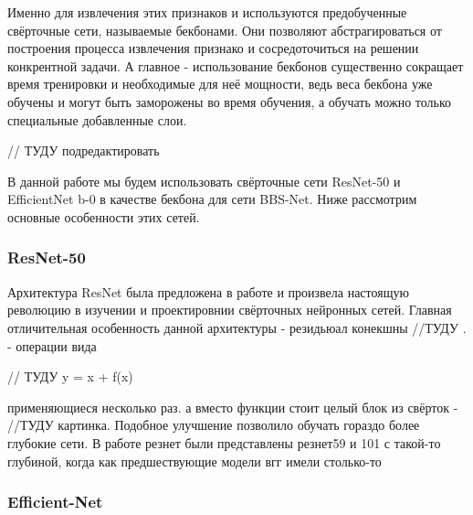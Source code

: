 Именно для извлечения этих признаков и используются предобученные свёрточные сети, называемые бекбонами. Они позволяют 
абстрагироваться от построения процесса извлечения признако и сосредоточиться на решении конкрентной задачи.
А главное - использование бекбонов существенно сокращает время тренировки и необходимые для неё мощности,
ведь веса бекбона уже обучены и могут быть заморожены во время обучения, а обучать можно только специальные добавленные слои.

// ТУДУ подредактировать

В данной работе мы будем использовать свёрточные сети ResNet-50\cite{ResNet} и EfficientNet b-0\cite{Efficientnet} 
в качестве бекбона для сети BBS-Net\cite{BBS}. Ниже рассмотрим основные особенности этих сетей.

\subsubsection{ResNet-50}

Архитектура ResNet была предложена в работе \cite{ResNet} и произвела настоящую революцию 
в изучении и проектировнии свёрточных нейронных сетей. Главная отличительная особенность данной архитектуры -
резидьюал конекшны //ТУДУ . - операции вида 

// ТУДУ y = x + f(x)


применяющиеся несколько раз. а вместо функции стоит целый блок из свёрток - //ТУДУ картинка.
Подобное улучшение позволило обучать гораздо более глубокие сети. 
В работе резнет были представлены резнет59 и 101 с такой-то глубиной, когда как предшествующие модели вгг имели столько-то 


\subsubsection{Efficient-Net}


